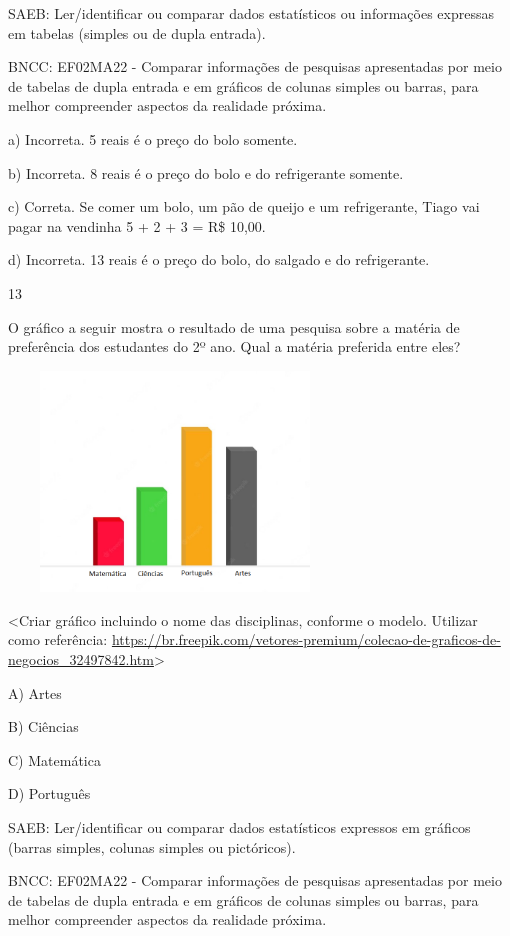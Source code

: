 \begin{escolha}
\begin{escolha}
{{{{{{{{SAEB: Ler/identificar ou comparar dados estatísticos ou
informações expressas em tabelas (simples ou de dupla entrada).

BNCC: EF02MA22 - Comparar informações de pesquisas apresentadas por meio
de tabelas de dupla entrada e em gráficos de colunas simples ou barras,
para melhor compreender aspectos da realidade próxima.

a) Incorreta. 5 reais é o preço do bolo somente.

b) Incorreta. 8 reais é o preço do bolo e do refrigerante somente.

c) Correta. Se comer um bolo, um pão de queijo e um refrigerante, Tiago
vai pagar na vendinha 5 + 2 + 3 = R\$ 10,00.

d) Incorreta. 13 reais é o preço do bolo, do salgado e do refrigerante.

\num{13}

O gráfico a seguir mostra o resultado de uma pesquisa sobre a matéria de
preferência dos estudantes do 2º ano. Qual a matéria preferida entre eles?

\includegraphics[width=3.48228in,height=2.30682in]{media/image160.png}

\textless{}Criar gráfico incluindo o nome das disciplinas, conforme o
modelo. Utilizar como referência:
\url{https://br.freepik.com/vetores-premium/colecao-de-graficos-de-negocios_32497842.htm}\textgreater{}

A) Artes

B) Ciências

C) Matemática

D) Português

SAEB: Ler/identificar ou comparar dados estatísticos expressos
em gráficos (barras simples, colunas simples ou pictóricos).

BNCC: EF02MA22 - Comparar informações de pesquisas apresentadas por meio
de tabelas de dupla entrada e em gráficos de colunas simples ou barras,
para melhor compreender aspectos da realidade próxima.

}}}}}}}}
\end{escolha}
\end{escolha}
